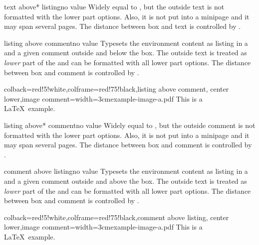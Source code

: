 \begin{docTcbKey}[][doc new=2014-11-07]{text above* listing}{}{no value}
  Widely equal to , but the outside text is
  not formatted with the lower part options.
  Also, it is not put into a minipage and it may span several pages.
  The distance between box and text is controlled by .
\end{docTcbKey}



\begin{docTcbKey}{listing above comment}{}{no value}
  Typesets the environment content as listing in a 
  and a given comment outside and below the box.
  The outside text is treated as \emph{lower} part of the
   and can be formatted with all lower part options.
  The distance between box and comment is controlled by .
\begin{dispExample}
\begin{tcblisting}{colback=red!5!white,colframe=red!75!black,listing above comment,
  center lower,image comment={width=3cm}{example-image-a.pdf}}
This is a \LaTeX\ example.
\end{tcblisting}
\end{dispExample}
\end{docTcbKey}


\begin{docTcbKey}[][doc new=2014-11-07]{listing above* comment}{}{no value}
  Widely equal to , but the outside comment is
  not formatted with the lower part options.
  Also, it is not put into a minipage and it may span several pages.
  The distance between box and comment is controlled by .
\end{docTcbKey}

\clearpage

\begin{docTcbKey}{comment above listing}{}{no value}
  Typesets the environment content as listing in a 
  and a given comment outside and above the box.
  The outside text is treated as \emph{lower} part of the
   and can be formatted with all lower part options.
  The distance between box and comment is controlled by .
\begin{dispExample}
\begin{tcblisting}{colback=red!5!white,colframe=red!75!black,comment above listing,
  center lower,image comment={width=3cm}{example-image-a.pdf}}
This is a \LaTeX\ example.
\end{tcblisting}
\end{dispExample}
\end{docTcbKey}


